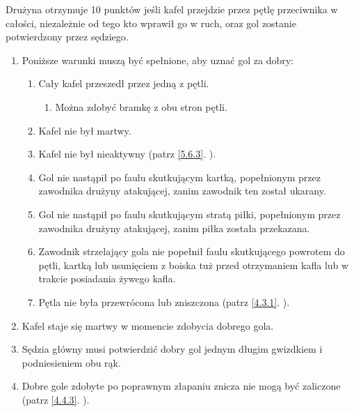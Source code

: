 \documentclass[11pt,a4paper]{article}
\renewcommand{\subsubsection}[1]{
  \oldsubsubsection{#1}%
  \label{\thesubsubsection}
}
\newcommand{\myref}[1]{\ref{#1}. \nameref{#1}}
\begin{document}
\subsubsection{Dobry gol}
Drużyna otrzymuje 10 punktów jeśli kafel przejdzie przez pętlę przeciwnika w całości, niezależnie od tego kto wprawił go w ruch, oraz gol zostanie potwierdzony przez sędziego.
\begin{enumerate}
  \item Poniższe warunki muszą być spełnione, aby uznać gol za dobry:
  \begin{enumerate}
    \item Cały kafel przeszedł przez jedną z pętli.
    \begin{enumerate}
      \item Można zdobyć bramkę z obu stron pętli.
    \end{enumerate}
    \item Kafel nie był martwy.
    \item Kafel nie był nieaktywny (patrz \myref{5.6.3}).
    \item Gol nie nastąpił po faulu skutkującym kartką, popełnionym przez zawodnika drużyny atakującej, zanim zawodnik ten został ukarany.
    \item Gol nie nastąpił po faulu skutkującym stratą piłki, popełnionym przez zawodnika drużyny atakującej, zanim piłka została przekazana.
    \item Zawodnik strzelający gola nie popełnił faulu skutkującego powrotem do pętli, kartką lub usunięciem z boiska tuż przed otrzymaniem kafla lub w trakcie posiadania żywego kafla.
    \item Pętla nie była przewrócona lub zniszczona (patrz \myref{4.3.1}).
  \end{enumerate}
  \item Kafel staje się martwy w momencie zdobycia dobrego gola.
  \item Sędzia główny musi potwierdzić dobry gol jednym długim gwizdkiem i podniesieniem obu rąk.
  \item Dobre gole zdobyte po poprawnym złapaniu znicza nie mogą być zaliczone (patrz \myref{4.4.3}).
\end{enumerate}
\end{document}
